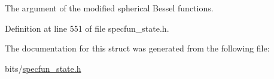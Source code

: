 The argument of the modified spherical Bessel functions. 



Definition at line 551 of file specfun\+\_\+state.\+h.



The documentation for this struct was generated from the following file\+:\begin{DoxyCompactItemize}
\item 
bits/\hyperlink{specfun__state_8h}{specfun\+\_\+state.\+h}\end{DoxyCompactItemize}
